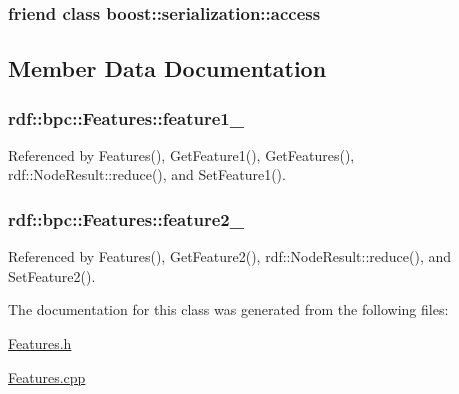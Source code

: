\subsubsection[{\texorpdfstring{boost\+::serialization\+::access}{boost::serialization::access}}]{\setlength{\rightskip}{0pt plus 5cm}friend class boost\+::serialization\+::access\hspace{0.3cm}{\ttfamily [friend]}}\hypertarget{classrdf_1_1bpc_1_1Features_ac98d07dd8f7b70e16ccb9a01abf56b9c}{}\label{classrdf_1_1bpc_1_1Features_ac98d07dd8f7b70e16ccb9a01abf56b9c}


\subsection{Member Data Documentation}
\subsubsection[{\texorpdfstring{feature1\+\_\+}{feature1_}}]{ rdf\+::bpc\+::\+Features\+::feature1\+\_\+}\hypertarget{classrdf_1_1bpc_1_1Features_a01f4d6cb79311da3b39f82882112bbcb}{}\label{classrdf_1_1bpc_1_1Features_a01f4d6cb79311da3b39f82882112bbcb}


Referenced by Features(), Get\+Feature1(), Get\+Features(), rdf\+::\+Node\+Result\+::reduce(), and Set\+Feature1().

\subsubsection[{\texorpdfstring{feature2\+\_\+}{feature2_}}]{ rdf\+::bpc\+::\+Features\+::feature2\+\_\+}\hypertarget{classrdf_1_1bpc_1_1Features_a563e43877615b6967a5ec9049bab4b65}{}\label{classrdf_1_1bpc_1_1Features_a563e43877615b6967a5ec9049bab4b65}


Referenced by Features(), Get\+Feature2(), rdf\+::\+Node\+Result\+::reduce(), and Set\+Feature2().



The documentation for this class was generated from the following files\+:\begin{DoxyCompactItemize}
\item 
\hyperlink{Features_8h}{Features.\+h}\item 
\hyperlink{Features_8cpp}{Features.\+cpp}\end{DoxyCompactItemize}

